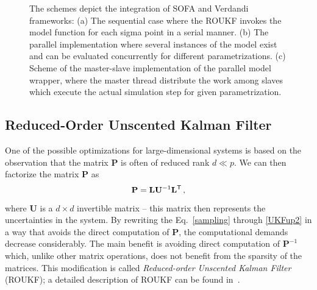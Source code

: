 \begin{figure}[t!]%
\centering%
\hfill
{}
\hfill
{}
\caption{The schemes depict the integration of SOFA and Verdandi frameworks: (a) The sequential case where the ROUKF invokes the 
model function for each sigma point in a serial manner. (b) The parallel implementation where several instances of the model 
exist and can be evaluated concurrently for different parametrizations. (c) Scheme of the master-slave implementation of the parallel model 
wrapper, where the master thread distribute the work among slaves which execute the actual simulation step for given parametrization.}%
\label{f:integration}
\end{figure}

\subsection{Reduced-Order Unscented Kalman Filter}
\label{sm:ROUKF}

One of the possible optimizations for large-dimensional systems is based on the observation that the matrix $\mathbf{P}$ is often of reduced rank $d \ll p$. We can then factorize the matrix $\mathbf{P}$ as
\begin{equation*}
\mathbf{P} = \mathbf{L} \mathbf{U}^{-1}\mathbf{L}^{\sf T} \,,
\end{equation*}
where $\mathbf{U}$ is a $d \times d$ invertible matrix -- this matrix then represents the uncertainties in the system. By rewriting the Eq.~\ref{sampling} through \ref{UKFup2} in a way that avoids the direct computation of $\mathbf{P}$, the computational demands decrease considerably. The main benefit is avoiding direct computation of $\mathbf{P}^{-1}$ which, unlike other matrix operations, does not benefit from the sparsity of the matrices. This modification is called \emph{Reduced-order Unscented Kalman Filter} (ROUKF); a detailed description of ROUKF can be found in~\cite{moireau2011reduced}.

